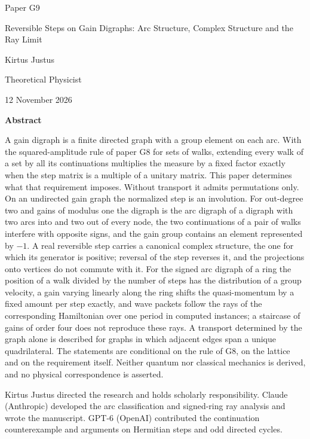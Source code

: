 \documentclass[11pt,a4paper]{article}
\begin{document}
\begin{titlepage}
{\small\sffamily \ProgramTitle\hfill Paper G9\par}
\vspace*{8mm}
{\LARGE\bfseries\raggedright{} Reversible Steps on Gain Digraphs: Arc Structure, Complex Structure and the Ray Limit\par}
\vspace{9mm}
{\large Kirtus Justus\par}
\vspace{1mm}
Theoretical Physicist\par
\AuthorLocation\par
\vspace{2mm}
12 November 2026\par
\vspace{8mm}
\textbf{Abstract}\par
A gain digraph is a finite directed graph with a group element on each arc. With the squared-amplitude rule of paper G8 for sets of walks, extending every walk of a set by all its continuations multiplies the measure by a fixed factor exactly when the step matrix is a multiple of a unitary matrix. This paper determines what that requirement imposes. Without transport it admits permutations only. On an undirected gain graph the normalized step is an involution. For out-degree two and gains of modulus one the digraph is the arc digraph of a digraph with two arcs into and two out of every node, the two continuations of a pair of walks interfere with opposite signs, and the gain group contains an element represented by $-1$. A real reversible step carries a canonical complex structure, the one for which its generator is positive; reversal of the step reverses it, and the projections onto vertices do not commute with it. For the signed arc digraph of a ring the position of a walk divided by the number of steps has the distribution of a group velocity, a gain varying linearly along the ring shifts the quasi-momentum by a fixed amount per step exactly, and wave packets follow the rays of the corresponding Hamiltonian over one period in computed instances; a staircase of gains of order four does not reproduce these rays. A transport determined by the graph alone is described for graphs in which adjacent edges span a unique quadrilateral. The statements are conditional on the rule of G8, on the lattice and on the requirement itself. Neither quantum nor classical mechanics is derived, and no physical correspondence is asserted.\par
\vfill
{\small Kirtus Justus directed the research and holds scholarly responsibility. Claude (Anthropic) developed the arc classification and signed-ring ray analysis and wrote the manuscript. GPT-6 (OpenAI) contributed the continuation counterexample and arguments on Hermitian steps and odd directed cycles.\par}
\end{titlepage}
\end{document}

